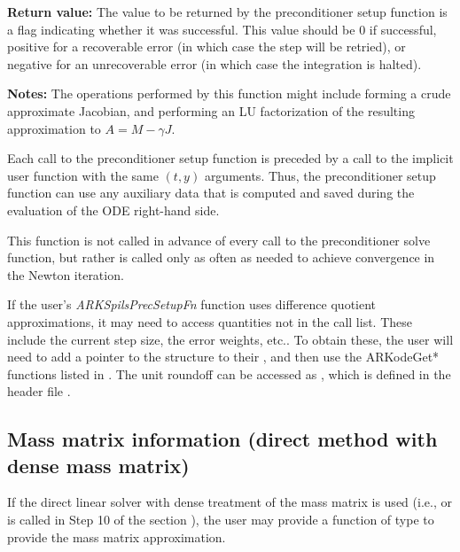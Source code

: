\documentclass[letterpaper,10pt,english]{sphinxmanual}
\begin{document}
\begin{fulllineitems}
\begin{description}
\begin{itemize}
\end{itemize}

\end{description}

\textbf{Return value:}
The value to be returned by the preconditioner setup
function is a flag indicating whether it was successful. This value
should be 0 if successful, positive for a recoverable error (in
which case the step will be retried), or negative for an
unrecoverable error (in which case the integration is halted).

\textbf{Notes:}  The operations performed by this function might include
forming a crude approximate Jacobian, and performing an LU
factorization of the resulting approximation to \(A = M -
\gamma J\).

Each call to the preconditioner setup function is preceded by a
call to the implicit {\hyperref[c_interface/User_supplied:c.ARKRhsFn]{\emph{}}} user function with the same
\((t,y)\) arguments.  Thus, the preconditioner setup function can
use any auxiliary data that is computed and saved during the
evaluation of the ODE right-hand side.

This function is not called in advance of every call to the
preconditioner solve function, but rather is called only as often
as needed to achieve convergence in the Newton iteration.

If the user's \emph{ARKSpilsPrecSetupFn} function uses difference
quotient approximations, it may need to access quantities not in
the call list. These include the current step size, the error
weights, etc..  To obtain these, the user will need to add a
pointer to the  structure to their , and
then use the ARKodeGet* functions listed in
{\hyperref[c_interface/User_callable:cinterface-optionaloutputs]{\emph{}}}. The unit roundoff can be
accessed as , which is defined in the header
file .

\end{fulllineitems}



\subsection{Mass matrix information (direct method with dense mass matrix)}
\label{c_interface/User_supplied:cinterface-densemassfn}\label{c_interface/User_supplied:mass-matrix-information-direct-method-with-dense-mass-matrix}
If the direct linear solver with dense treatment of the mass matrix is
used (i.e., {\hyperref[c_interface/User_callable:c.ARKMassDense]{\emph{}}} or {\hyperref[c_interface/User_callable:c.ARKMassLapackDense]{\emph{}}}
is called in Step 10 of the section {\hyperref[c_interface/Skeleton:cinterface-skeleton]{\emph{}}}), the
user may provide a function of type {\hyperref[c_interface/User_supplied:c.ARKDlsDenseMassFn]{\emph{}}} to
provide the mass matrix approximation.
\end{document}
